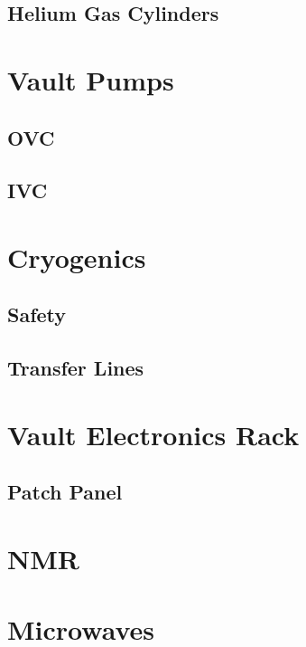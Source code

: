   \subsection{Helium Gas Cylinders}
  
\section{Vault Pumps}
  \subsection{OVC}
  \subsection{IVC}

\section{Cryogenics}
  \subsection{Safety}
  \subsection{Transfer Lines}

\section{Vault Electronics Rack}
  \subsection{Patch Panel}
  \subsection{}

\section{NMR}

\section{Microwaves}
